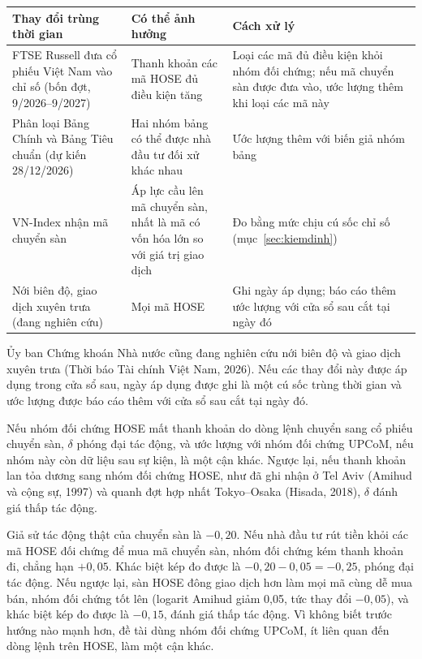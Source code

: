 \begin{center}
\label{tab:trungthoigian}
{\bangnho
\begin{tabularx}{\textwidth}{@{}>{\raggedright\arraybackslash}p{} L L@{}}
\toprule
Thay đổi trùng thời gian & Có thể ảnh hưởng & Cách xử lý\\
\midrule
FTSE Russell đưa cổ phiếu Việt Nam vào chỉ số (bốn đợt, 9/2026--9/2027) & Thanh khoản các mã HOSE đủ điều kiện tăng & Loại các mã đủ điều kiện khỏi nhóm đối chứng; nếu mã chuyển sàn được đưa vào, ước lượng thêm khi loại các mã này\\
Phân loại Bảng Chính và Bảng Tiêu chuẩn (dự kiến 28/12/2026) & Hai nhóm bảng có thể được nhà đầu tư đối xử khác nhau & Ước lượng thêm với biến giả nhóm bảng\\
VN-Index nhận mã chuyển sàn & Áp lực cầu lên mã chuyển sàn, nhất là mã có vốn hóa lớn so với giá trị giao dịch & Đo bằng mức chịu cú sốc chỉ số (mục~\ref{sec:kiemdinh})\\
Nới biên độ, giao dịch xuyên trưa (đang nghiên cứu) & Mọi mã HOSE & Ghi ngày áp dụng; báo cáo thêm ước lượng với cửa sổ sau cắt tại ngày đó\\
\bottomrule
\end{tabularx}}
\end{center}

Ủy ban Chứng khoán Nhà nước cũng đang nghiên cứu nới biên độ và giao dịch xuyên trưa (Thời báo Tài chính Việt Nam, 2026). Nếu các thay đổi này được áp dụng trong cửa sổ sau, ngày áp dụng được ghi là một cú sốc trùng thời gian và ước lượng được báo cáo thêm với cửa sổ sau cắt tại ngày đó.

Nếu nhóm đối chứng HOSE mất thanh khoản do dòng lệnh chuyển sang cổ phiếu chuyển sàn, $\delta$ phóng đại tác động, và ước lượng với nhóm đối chứng UPCoM, nếu nhóm này còn dữ liệu sau sự kiện, là một cận khác. Ngược lại, nếu thanh khoản lan tỏa dương sang nhóm đối chứng HOSE, như đã ghi nhận ở Tel Aviv (Amihud và cộng sự, 1997) và quanh đợt hợp nhất Tokyo--Osaka (Hisada, 2018), $\delta$ đánh giá thấp tác động.

\begin{vidu}
Giả sử tác động thật của chuyển sàn là $-0{,}20$. Nếu nhà đầu tư rút tiền khỏi các mã HOSE đối chứng để mua mã chuyển sàn, nhóm đối chứng kém thanh khoản đi, chẳng hạn $+0{,}05$. Khác biệt kép đo được là $-0{,}20 - 0{,}05 = -0{,}25$, phóng đại tác động. Nếu ngược lại, sàn HOSE đông giao dịch hơn làm mọi mã cùng dễ mua bán, nhóm đối chứng tốt lên (logarit Amihud giảm 0,05, tức thay đổi $-0{,}05$), và khác biệt kép đo được là $-0{,}15$, đánh giá thấp tác động. Vì không biết trước hướng nào mạnh hơn, đề tài dùng nhóm đối chứng UPCoM, ít liên quan đến dòng lệnh trên HOSE, làm một cận khác.
\end{vidu}

